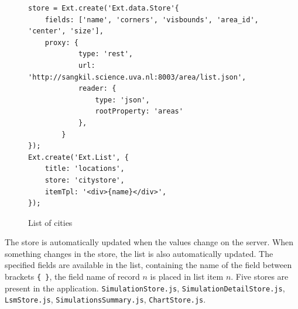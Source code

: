 \begin{figure}[H]
\begin{lstlisting}
store = Ext.create('Ext.data.Store'{
    fields: ['name', 'corners', 'visbounds', 'area_id', 'center', 'size'],
	proxy: {
			type: 'rest',
			url: 'http://sangkil.science.uva.nl:8003/area/list.json',
			reader: {
				type: 'json',
				rootProperty: 'areas'
			},
		}
});
Ext.create('Ext.List', {
	title: 'locations',
	store: 'citystore',
	itemTpl: '<div>{name}</div>',
});
\end{lstlisting}
\caption{List of cities}
\label{fig:sencha}
\end{figure}
The store is automatically updated when the values change on the server. When something changes in the store, the list is also automatically updated. The specified fields are available in the list, containing the name of the field between brackets \texttt{\{ \}}, the field name of record $n$ is placed in list item $n$. Five stores are present in the application. \texttt{SimulationStore.js}, \texttt{SimulationDetailStore.js}, \texttt{LsmStore.js}, \texttt{SimulationsSummary.js}, \texttt{ChartStore.js}. 
